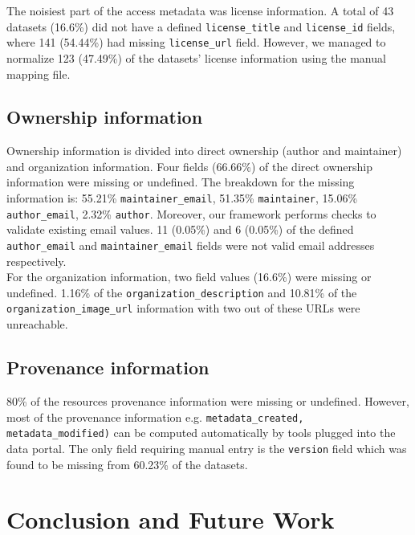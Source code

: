 \documentclass[runningheads,a4paper]{llncs}
\begin{document}
The noisiest part of the access metadata was license information. A total of 43 datasets (16.6\%) did not have a defined \texttt{license\_title} and \texttt{license\_id} fields, where 141 (54.44\%) had missing \texttt{license\_url} field. However, we managed to normalize 123 (47.49\%) of the datasets' license information using the manual mapping file.

\subsection{Ownership information} Ownership information is divided into direct ownership (author and maintainer) and organization information. Four fields (66.66\%) of the direct ownership information were missing or undefined. The breakdown for the missing information is: 55.21\% \texttt{maintainer\_email}, 51.35\% \texttt{maintainer}, 15.06\% \texttt{author\_email}, 2.32\% \texttt{author}. Moreover, our framework performs checks to validate existing email values. 11 (0.05\%) and 6 (0.05\%) of the defined \texttt{author\_email} and \texttt{maintainer\_email} fields were not valid email addresses respectively.\\
For the organization information, two field values (16.6\%) were missing or undefined. 1.16\% of the \texttt{organization\_description} and 10.81\% of the \texttt{organization\-\_image\_url} information with two out of these URLs were unreachable.

\subsection{Provenance information} 80\% of the resources provenance information were missing or undefined. However, most of the provenance information e.g. \texttt{metadata\_created, metadata\_modified)} can be computed automatically by tools plugged into the data portal. The only field requiring manual entry is the \texttt{version} field which was found to be missing from 60.23\% of the datasets.

\section{Conclusion and Future Work}
\label{sec:conclusion}
\end{document}
